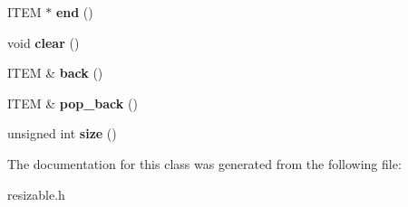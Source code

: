 \begin{DoxyCompactItemize}
\item 
I\+T\+EM $\ast$ {\bfseries end} ()\hypertarget{classResizable_aba323c5a291c4d5901a9c25c5cc99dff}{}\label{classResizable_aba323c5a291c4d5901a9c25c5cc99dff}

\item 
void {\bfseries clear} ()\hypertarget{classResizable_aea90380582734eca1762a850ecd6eb4c}{}\label{classResizable_aea90380582734eca1762a850ecd6eb4c}

\item 
I\+T\+EM \& {\bfseries back} ()\hypertarget{classResizable_ae650893232ad39924a609c8c8f15d4e9}{}\label{classResizable_ae650893232ad39924a609c8c8f15d4e9}

\item 
I\+T\+EM \& {\bfseries pop\+\_\+back} ()\hypertarget{classResizable_a118acbb4a26c7d44ef26ed2f4bc84b76}{}\label{classResizable_a118acbb4a26c7d44ef26ed2f4bc84b76}

\item 
unsigned int {\bfseries size} ()\hypertarget{classResizable_aec4acefa5b753abaf916bdc152985b4b}{}\label{classResizable_aec4acefa5b753abaf916bdc152985b4b}

\end{DoxyCompactItemize}


The documentation for this class was generated from the following file\+:\begin{DoxyCompactItemize}
\item 
resizable.\+h\end{DoxyCompactItemize}
